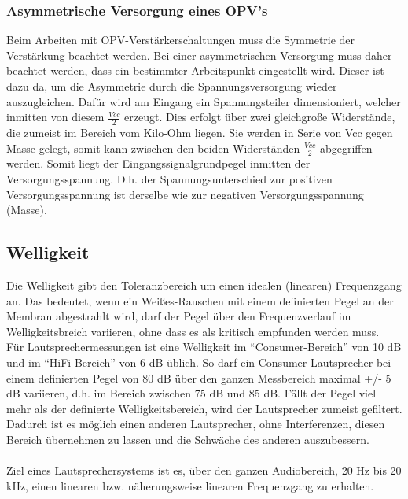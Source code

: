 \subsubsection*{Asymmetrische Versorgung eines OPV's}\label{subsec:8.5.1}
Beim Arbeiten mit OPV-Verstärkerschaltungen muss die Symmetrie der Verstärkung beachtet werden.
Bei einer asymmetrischen Versorgung muss daher beachtet werden, dass ein bestimmter Arbeitspunkt eingestellt wird.
Dieser ist dazu da, um die Asymmetrie durch die Spannungsversorgung wieder auszugleichen.
Dafür wird am Eingang ein Spannungsteiler dimensioniert, welcher inmitten von diesem $\frac{Vcc}{2}$ erzeugt.
Dies erfolgt über zwei gleichgroße Widerstände, die zumeist im Bereich vom Kilo-Ohm liegen.
Sie werden in Serie von Vcc gegen Masse gelegt, somit kann zwischen den beiden Widerständen $\frac{Vcc}{2}$ abgegriffen werden.
Somit liegt der Eingangssignalgrundpegel inmitten der Versorgungsspannung.
D.h. der Spannungsunterschied zur positiven Versorgungsspannung ist derselbe wie zur negativen Versorgungsspannung (Masse). 


\newpage
\subsection{Welligkeit} \label{sec:8.6}
Die Welligkeit gibt den Toleranzbereich um einen idealen (linearen) Frequenzgang an.
Das bedeutet, wenn ein Weißes-Rauschen mit einem definierten Pegel an der Membran abgestrahlt wird, darf der Pegel über den Frequenzverlauf im Welligkeitsbreich variieren, ohne dass es als kritisch empfunden werden muss. \\
Für Lautsprechermessungen ist eine Welligkeit im \enquote{Consumer-Bereich} von 10 dB und im \enquote{HiFi-Bereich} von 6 dB üblich.
So darf ein Consumer-Lautsprecher bei einem definierten Pegel von 80 dB über den ganzen Messbereich maximal +/- 5 dB variieren, d.h. im Bereich zwischen 75 dB und 85 dB.
Fällt der Pegel viel mehr als der definierte Welligkeitsbereich, wird der Lautsprecher zumeist gefiltert.
Dadurch ist es möglich einen anderen Lautsprecher, ohne Interferenzen, diesen Bereich übernehmen zu lassen und die Schwäche des anderen auszubessern.\\ \\
Ziel eines Lautsprechersystems ist es, über den ganzen Audiobereich, 20 Hz bis 20 kHz, einen linearen bzw. näherungsweise linearen Frequenzgang zu erhalten.

